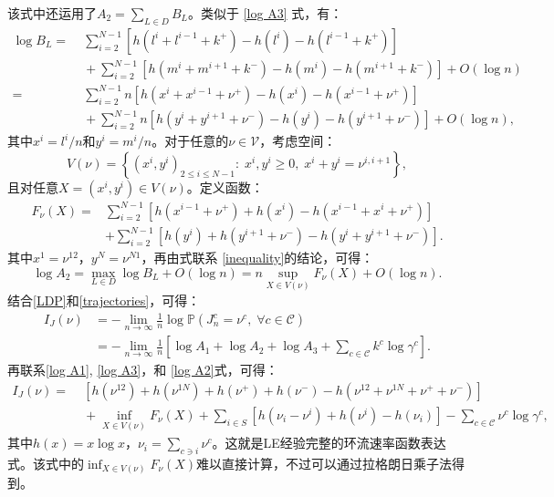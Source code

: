 该式中还运用了$A_2 = \sum_{L\in D}B_L$。类似于 \ref{log A3} 式，有：
\begin{equation}\label{log BL}
    \begin{split}
    \log B_L =&\;\sum_{i=2}^{N-1}[h(l^i+l^{i-1}+k^+)-h(l^i)-h(l^{i-1}+k^+)]\\
    &\;+\sum_{i=2}^{N-1}[h(m^i+m^{i+1}+k^-)-h(m^i)-h(m^{i+1}+k^-)]+O(\log n)\\
    =&\;\sum_{i=2}^{N-1}n[h(x^i+x^{i-1}+\nu^+)-h(x^i)-h(x^{i-1}+\nu^+)]\\
    &\;+\sum_{i=2}^{N-1}n[h(y^i+y^{i+1}+\nu^-)-h(y^i)-h(y^{i+1}+\nu^-)]+O(\log n),
    \end{split}
\end{equation}
其中$x^i = l^i/n$和$y^i = m^i/n$。对于任意的$\nu \in \mathcal{V}$，考虑空间：
\begin{equation*}
    V(\nu) = \left\{\left(x^{i},y^{i}\right)_{2\le i\le N-1}:\;x^i,y^i\geq0,\;x^{i}+y^{i}=\nu^{i,i+1}\right\},
\end{equation*}
且对任意$X = (x^i, y^i) \in V(\nu)$。定义函数：
\begin{equation}\label{formula:F}
    \begin{split}
    F_{\nu}(X)
    =&\sum_{i=2}^{N-1}\left[ h\left(x^{i-1}+\nu^+\right) + h\left(x^{i}\right) - h\left(x^{i-1}+x^{i}+\nu^+\right) \right] \\
    &+ \sum_{i=2}^{N-1} \left[h\left(y^{i}\right) + h\left(y^{i+1} +\nu^-\right)-h\left(y^{i} +y^{i+1} +\nu^-\right)\right].
    \end{split}
\end{equation}
其中$x^1=\nu^{12}$，$y^N=\nu^{N1}$，再由式联系 \ref{inequality}的结论，可得：
\begin{equation}\label{log A2}
    \log A_2 = \max_{L\in D}\log B_L+O(\log n)
    = n\sup_{X\in V(\nu)}F_{\nu}(X)+O(\log n).
\end{equation}
结合\eqref{LDP}和\eqref{trajectories}，可得：
\begin{equation*}
    \begin{split}
    I_J(\nu) &= -\lim_{n\to\infty}\frac{1}{n}\log\mathbb{P}\left(J^c_n=\nu^c,\;\forall c\in\mathcal{C}\right)\\
    &= -\lim_{n\to\infty}\frac{1}{n}\left[\log A_1+\log A_2+\log A_3+\sum_{c\in\mathcal{C}}k^c\log\gamma^c\right].
    \end{split}
\end{equation*}
再联系\eqref{log A1}, \eqref{log A3}，和 \eqref{log A2}式，可得：
\begin{equation}\label{ratefunction}
    \begin{split}
    I_J(\nu) =&\; \left[h\left(\nu^{12}\right)+h\left(\nu^{1N}\right)
    +h\left(\nu^+\right)+h\left(\nu^-\right)-h\left(\nu^{12}+\nu^{1N}+\nu^++\nu^-\right)\right] \\
    &\;+\inf_{X\in V(\nu)}F_{\nu}(X)+\sum_{i\in S}\left[ h\left(\nu_i-\nu^i\right)+h\left(\nu^i\right)
    -h\left(\nu_i\right)\right]-\sum_{c\in\mathcal{C}}\nu^c\log\gamma^c,
    \end{split}
\end{equation}
其中$h(x) = x \log x$，$\nu_i=\sum_{c\ni i}\nu^c$。这就是LE经验完整的环流速率函数表达式。该式中的$\inf_{X\in V(\nu)}F_{\nu}(X)$难以直接计算，不过可以通过拉格朗日乘子法得到。

